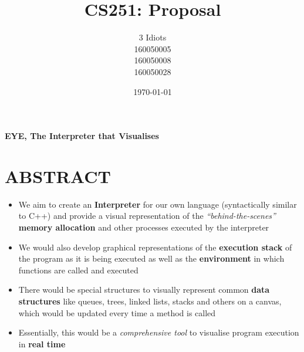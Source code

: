 \documentclass{article}
\title{CS251: Proposal}
\author{3 Idiots\\
160050005\\
160050008\\
160050028}
\date{\today}
\begin{document}
\maketitle
\newpage
\tableofcontents
\newpage
\begin{center}
{\Huge \bf EYE, The Interpreter that Visualises}
\end{center}
\section{ABSTRACT} 
\begin{itemize}
\item We aim to create an {\bf Interpreter} for our own language (syntactically similar to C++) and provide a visual representation of the \textit {“behind-the-scenes”} {\bf memory allocation} and other processes executed by the interpreter

\item We would also develop graphical representations of the {\bf execution stack} of the program as it is being executed as well as the {\bf environment} in which functions are called and executed 

\item There would be special structures to visually represent common {\bf data structures} like queues, trees, linked lists, stacks and others on a canvas, which would be updated every time a method is called

\item Essentially, this would be a \textit {comprehensive tool} to visualise program execution in {\bf real time}

\end{itemize}
\end{document}
